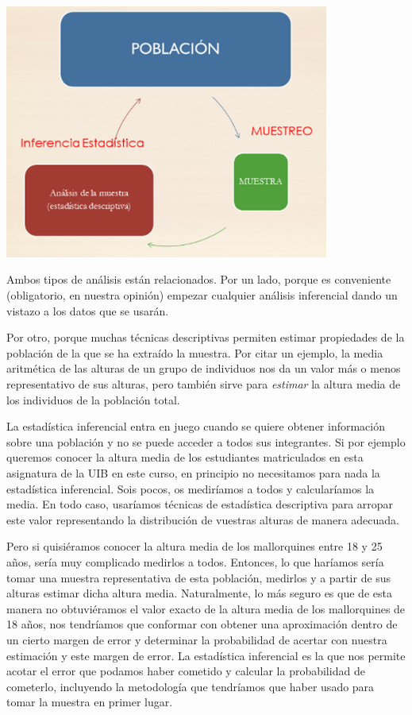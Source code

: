 \documentclass[
  letterpaper,
  DIV=11,
  numbers=noendperiod]{scrreprt}
\begin{document}
\begin{center}
\includegraphics[width=0.8\textwidth,height=\textheight]{Figuras/muestreo_inferencia.png}
\end{center}

Ambos tipos de análisis están relacionados. Por un lado, porque es
conveniente (obligatorio, en nuestra opinión) empezar cualquier análisis
inferencial dando un vistazo a los datos que se usarán.

Por otro, porque muchas técnicas descriptivas permiten estimar
propiedades de la población de la que se ha extraído la muestra. Por
citar un ejemplo, la media aritmética de las alturas de un grupo de
individuos nos da un valor más o menos representativo de sus alturas,
pero también sirve para \emph{estimar} la altura media de los individuos
de la población total.

La estadística inferencial entra en juego cuando se quiere obtener
información sobre una población y no se puede acceder a todos sus
integrantes. Si por ejemplo queremos conocer la altura media de los
estudiantes matriculados en esta asignatura de la UIB en este curso, en
principio no necesitamos para nada la estadística inferencial. Sois
pocos, os mediríamos a todos y calcularíamos la media. En todo caso,
usaríamos técnicas de estadística descriptiva para arropar este valor
representando la distribución de vuestras alturas de manera adecuada.

Pero si quisiéramos conocer la altura media de los mallorquines entre 18
y 25 años, sería muy complicado medirlos a todos. Entonces, lo que
haríamos sería tomar una muestra representativa de esta población,
medirlos y a partir de sus alturas estimar dicha altura media.
Naturalmente, lo más seguro es que de esta manera no obtuviéramos el
valor exacto de la altura media de los mallorquines de 18 años, nos
tendríamos que conformar con obtener una aproximación dentro de un
cierto margen de error y determinar la probabilidad de acertar con
nuestra estimación y este margen de error. La estadística inferencial es
la que nos permite acotar el error que podamos haber cometido y calcular
la probabilidad de cometerlo, incluyendo la metodología que tendríamos
que haber usado para tomar la muestra en primer lugar.
\end{document}
